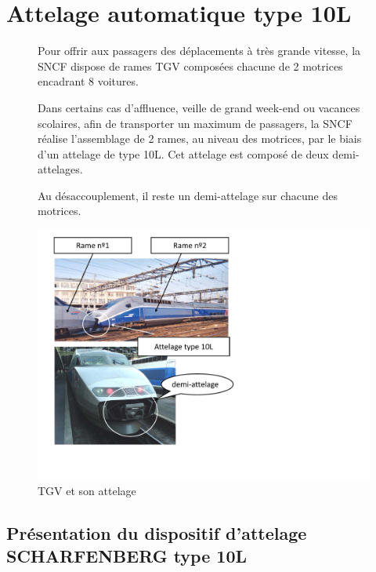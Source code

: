 \newpage

\section{Attelage automatique type 10L}

\begin{figure}[!h]
 \begin{minipage}{0.6\linewidth}
Pour offrir aux passagers des déplacements à très grande vitesse, la SNCF dispose de rames TGV composées chacune de 2 motrices encadrant 8 voitures.

Dans certains cas d'affluence, veille de \og grand week-end \fg ou vacances scolaires, afin de transporter un maximum de passagers, la SNCF réalise l'assemblage de 2 rames, au niveau des motrices, par le biais d'un attelage de type 10L. Cet attelage est composé de deux demi-attelages.

Au désaccouplement, il reste un demi-attelage sur chacune des motrices.
 \end{minipage}
\hfill
 \begin{minipage}{0.35\linewidth}
  \centering\includegraphics[width=\linewidth]{img/Image1.pdf}
  \caption{TGV et son attelage}
  \label{img:image1}
 \end{minipage}
\end{figure}

\subsection{Présentation du dispositif d'attelage SCHARFENBERG type 10L}


